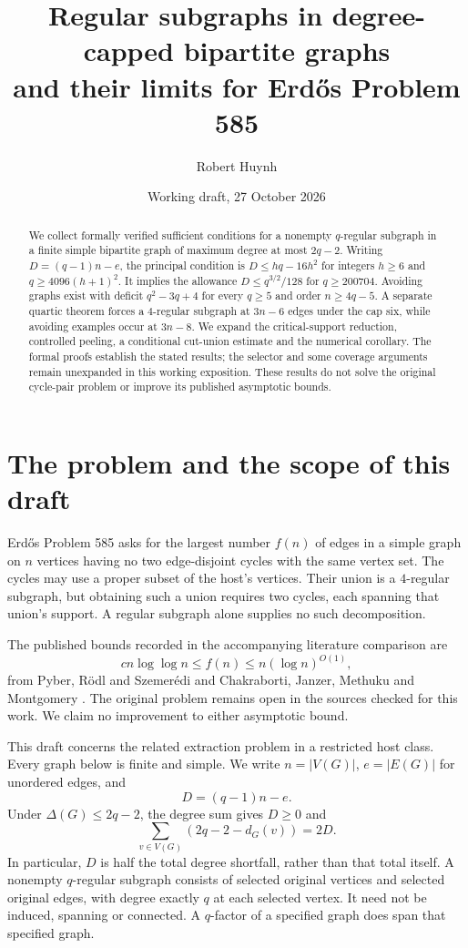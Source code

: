 \documentclass[11pt]{article}
\title{Regular subgraphs in degree-capped bipartite graphs\\and their limits for Erd\H{o}s Problem 585}
\author{Robert Huynh}
\date{Working draft, 27 October 2026}
\begin{document}
\maketitle
\begin{abstract}
We collect formally verified sufficient conditions for a nonempty $q$-regular subgraph in a finite simple bipartite graph of maximum degree at most $2q-2$. Writing $D=(q-1)n-e$, the principal condition is $D\le hq-16h^2$ for integers $h\ge6$ and $q\ge4096(h+1)^2$. It implies the allowance $D\le q^{3/2}/128$ for $q\ge200704$. Avoiding graphs exist with deficit $q^2-3q+4$ for every $q\ge5$ and order $n\ge4q-5$. A separate quartic theorem forces a $4$-regular subgraph at $3n-6$ edges under the cap six, while avoiding examples occur at $3n-8$. We expand the critical-support reduction, controlled peeling, a conditional cut-union estimate and the numerical corollary. The formal proofs establish the stated results; the selector and some coverage arguments remain unexpanded in this working exposition. These results do not solve the original cycle-pair problem or improve its published asymptotic bounds.
\end{abstract}
\tableofcontents

\section{The problem and the scope of this draft}
Erd\H{o}s Problem 585 asks for the largest number $f(n)$ of edges in a simple graph on $n$ vertices having no two edge-disjoint cycles with the same vertex set. The cycles may use a proper subset of the host's vertices. Their union is a $4$-regular subgraph, but obtaining such a union requires two cycles, each spanning that union's support. A regular subgraph alone supplies no such decomposition.

The published bounds recorded in the accompanying literature comparison are
\[
 c n\log\log n\le f(n)\le n(\log n)^{O(1)},
\]
from Pyber, R\"odl and Szemer\'edi \cite{PRS} and Chakraborti, Janzer, Methuku and Montgomery \cite{CJMMcycles}. The original problem remains open in the sources checked for this work. We claim no improvement to either asymptotic bound.

This draft concerns the related extraction problem in a restricted host class. Every graph below is finite and simple. We write $n=|V(G)|$, $e=|E(G)|$ for unordered edges, and
\[
 D=(q-1)n-e.
\]
Under $\Delta(G)\le2q-2$, the degree sum gives $D\ge0$ and
\[
 \sum_{v\in V(G)}(2q-2-d_G(v))=2D.
\]
In particular, $D$ is half the total degree shortfall, rather than that total itself.
A nonempty $q$-regular subgraph consists of selected original vertices and selected original edges, with degree exactly $q$ at each selected vertex. It need not be induced, spanning or connected. A $q$-factor of a specified graph does span that specified graph.
\end{document}
